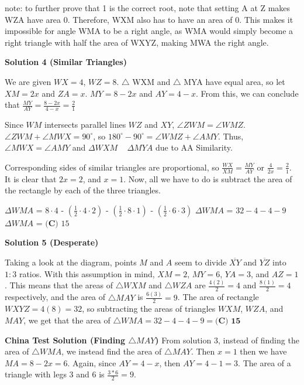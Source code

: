 \begin{enumerate}
 note: to further prove that 1 is the correct root, note that setting A at Z makes WZA have area 0. Therefore, WXM also has to have an area of 0. This makes it impossible for angle WMA to be a right angle, as WMA would simply become a right triangle with half the area of WXYZ, making MWA the right angle.

 



\textbf{Solution 4 (Similar Triangles)}

We are given $WX = 4$, $WZ = 8$. $\triangle$ WXM and $\triangle$ MYA have equal area, so let $XM = 2x$ and $ZA = x$. $MY = 8-2x$ and $AY = 4-x$. From this, we can conclude that $\frac{MY}{AY} = \frac{8-2x}{4-x} = \frac{2}{1}$

 Since $WM$ intersects parallel lines $WZ$ and $XY$, $\angle ZWM = \angle WMZ$. $\angle ZWM + \angle MWX = 90^\circ$, so $180^\circ - 90^\circ = \angle WMZ + \angle AMY$. Thus, $\angle MWX = \angle AMY$ and $\Delta WXM$ ~ $\Delta MYA$ due to AA Similarity. 

 Corresponding sides of similar triangles are proportional, so $\frac{WX}{XM} = \frac{MY}{AY}$ or $\frac{4}{2x} = \frac{2}{1}$. It is clear that $2x = 2$, and $x = 1$. Now, all we have to do is subtract the area of the rectangle by each of the three triangles.

 
$\Delta WMA$ = $8 \cdot 4$ - $\left(\frac{1}{2} \cdot 4 \cdot 2 \right)$ - $\left(\frac{1}{2} \cdot 8 \cdot 1 \right)$ - $\left(\frac{1}{2} \cdot 6 \cdot 3 \right)$
$\Delta WMA$ = $32 - 4 - 4 - 9$
$\Delta WMA$ = $\boxed{\textbf{(C) }15}$




\textbf{Solution 5 (Desperate)}

Taking a look at the diagram, points $M$ and $A$ seem to divide $\overline{XY}$ and $\overline{YZ}$ into $1:3$ ratios. With this assumption in mind, $XM=2$, $MY=6$, $YA=3$, and $AZ=1$. This means that the areas of $\triangle WXM$ and $\triangle WZA$ are $\frac{4(2)}{2}=4$ and $\frac{8(1)}{2}=4$ respectively, and the area of $\triangle MAY$ is $\frac{6(3)}{2}=9$. The area of rectangle $WXYZ=4(8)=32$, so subtracting the areas of triangles $WXM$, $WZA$, and $MAY$, we get that the area of $\triangle WMA=32-4-4-9=\boxed{\textbf{(C) 15}}$

 \textbf{China Test Solution (Finding $\triangle MAY$)} From solution 3, instead of finding the area of $\triangle WMA$, we instead find  the area of $\triangle MAY$. Then $x = 1$ then we have $MA = 8 - 2x = 6$. Again, since $AY = 4 - x$, then $AY = 4 - 1 = 3.$ The area of a triangle with legs $3$ and $6$ is $\frac{3 * 6}{2} = \boxed{9}$.


\end{enumerate}
